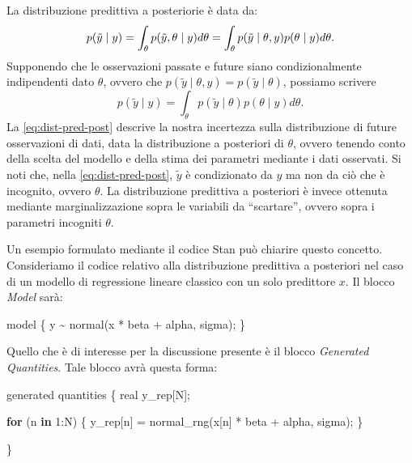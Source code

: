 \documentclass[
  10pt,
  italian,
  a4paper,
  extrafontsizes,onecolumn,openright
  ]{memoir}
\newenvironment{Shaded}{\begin{snugshade}}{\end{snugshade}}
\newcommand{\ControlFlowTok}[1]{\textcolor[rgb]{0.13,0.29,0.53}{\textbf{#1}}}
\newcommand{\DecValTok}[1]{\textcolor[rgb]{0.00,0.00,0.81}{#1}}
\newcommand{\FunctionTok}[1]{\textcolor[rgb]{0.00,0.00,0.00}{#1}}
\newcommand{\NormalTok}[1]{#1}
\newcommand{\OtherTok}[1]{\textcolor[rgb]{0.56,0.35,0.01}{#1}}
\newcommand{\SpecialCharTok}[1]{\textcolor[rgb]{0.00,0.00,0.00}{#1}}
\begin{document}
La distribuzione predittiva a posteriorie è data da:
\begin{equation}
p(\tilde{y} \mid y) = \int_{\theta} p(\tilde{y}, \theta \mid y) d \theta = \int_{\theta} p(\tilde{y} \mid \theta, y) p(\theta \mid y) d\theta.\notag
\end{equation}
\noindent
Supponendo che le osservazioni passate e future siano condizionalmente indipendenti dato \(\theta\), ovvero che \(p(\tilde{y} \mid \theta, y) = p(\tilde{y} \mid \theta)\), possiamo scrivere
\begin{equation}
p(\tilde{y} \mid y) = \int_{\theta} p(\tilde{y} \mid \theta) p(\theta \mid y) d\theta.
\label{eq:dist-pred-post}
\end{equation}
\noindent
La \eqref{eq:dist-pred-post} descrive la nostra incertezza sulla distribuzione di future osservazioni di dati, data la distribuzione a posteriori di \(\theta\), ovvero tenendo conto della scelta del modello e della stima dei parametri mediante i dati osservati. Si noti che, nella \eqref{eq:dist-pred-post}, \(\tilde{y}\) è condizionato da \(y\) ma non da ciò che è incognito, ovvero \(\theta\). La distribuzione predittiva a posteriori è invece ottenuta mediante marginalizzazione sopra le variabili da ``scartare'', ovvero sopra i parametri incogniti \(\theta\).

Un esempio formulato mediante il codice Stan può chiarire questo concetto.
Consideriamo il codice relativo alla distribuzione predittiva a posteriori nel caso di un modello di regressione lineare classico con un solo predittore \(x\). Il blocco \emph{Model} sarà:

\begin{Shaded}
\begin{Highlighting}[]
\NormalTok{model \{}
\NormalTok{ y }\SpecialCharTok{\textasciitilde{}} \FunctionTok{normal}\NormalTok{(x }\SpecialCharTok{*}\NormalTok{ beta }\SpecialCharTok{+}\NormalTok{ alpha, sigma);}
\NormalTok{\}}
\end{Highlighting}
\end{Shaded}

\noindent
Quello che è di interesse per la discussione presente è il blocco \emph{Generated Quantities}. Tale blocco avrà questa forma:

\begin{Shaded}
\begin{Highlighting}[]
\NormalTok{generated quantities \{}
\NormalTok{ real y\_rep[N];}

 \ControlFlowTok{for}\NormalTok{ (n }\ControlFlowTok{in} \DecValTok{1}\SpecialCharTok{:}\NormalTok{N) \{}
\NormalTok{   y\_rep[n] }\OtherTok{=} \FunctionTok{normal\_rng}\NormalTok{(x[n] }\SpecialCharTok{*}\NormalTok{ beta }\SpecialCharTok{+}\NormalTok{ alpha, sigma);}
\NormalTok{ \}}

\NormalTok{\}}
\end{Highlighting}
\end{Shaded}
\end{document}
